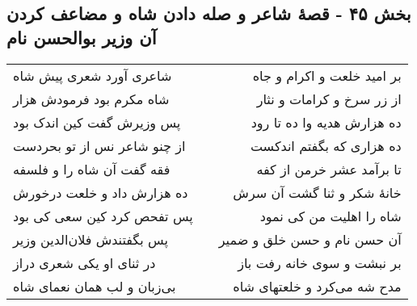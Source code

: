 \begin{center}
\section*{بخش ۴۵ - قصهٔ شاعر و صله دادن شاه و مضاعف کردن آن وزیر بوالحسن نام}
\label{sec:sh045}
\begin{longtable}{l p{0.5cm} r}
شاعری آورد شعری پیش شاه
&&
بر امید خلعت و اکرام و جاه
\\
شاه مکرم بود فرمودش هزار
&&
از زر سرخ و کرامات و نثار
\\
پس وزیرش گفت کین اندک بود
&&
ده هزارش هدیه وا ده تا رود
\\
از چنو شاعر نس از تو بحردست
&&
ده هزاری که بگفتم اندکست
\\
فقه گفت آن شاه را و فلسفه
&&
تا برآمد عشر خرمن از کفه
\\
ده هزارش داد و خلعت درخورش
&&
خانهٔ شکر و ثنا گشت آن سرش
\\
پس تفحص کرد کین سعی کی بود
&&
شاه را اهلیت من کی نمود
\\
پس بگفتندش فلان‌الدین وزیر
&&
آن حسن نام و حسن خلق و ضمیر
\\
در ثنای او یکی شعری دراز
&&
بر نبشت و سوی خانه رفت باز
\\
بی‌زبان و لب همان نعمای شاه
&&
مدح شه می‌کرد و خلعتهای شاه
\\
\end{longtable}
\end{center}
